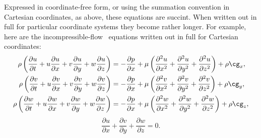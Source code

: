 \documentclass[twoside,11pt]		{report}
\begin{document}
Expressed in coordinate-free form, or using the summation convention
in Cartesian coordinates, as above, these equations are succint. When
written out in full for particular coordinate systems they become
rather longer. For example, here are the incompressible-flow \NavSto\
equations written out in full for Cartesian coordinates:
\begin{align*}
\rho\left(
 \frac{\partial u}{\partial t} +
u\frac{\partial u}{\partial x} +
v\frac{\partial u}{\partial y} +
w\frac{\partial u}{\partial z}\right) &=
-\frac{\partial p}{\partial x}+
\mu\left(
\frac{\partial^2 u}{\partial x^2} +
\frac{\partial^2 u}{\partial y^2} +
\frac{\partial^2 u}{\partial z^2}
\right) + \rho\cg_x,\\
\rho\left(
 \frac{\partial v}{\partial t} +
u\frac{\partial v}{\partial x} +
v\frac{\partial v}{\partial y} +
w\frac{\partial v}{\partial z}\right) &=
-\frac{\partial p}{\partial x}+
\mu\left(
\frac{\partial^2 v}{\partial x^2} +
\frac{\partial^2 v}{\partial y^2} +
\frac{\partial^2 v}{\partial z^2}
\right) + \rho\cg_y,\\
\rho\left(
 \frac{\partial w}{\partial t} +
u\frac{\partial w}{\partial x} +
v\frac{\partial w}{\partial y} +
w\frac{\partial w}{\partial z}\right) &=
-\frac{\partial p}{\partial x}+
\mu\left(
\frac{\partial^2 w}{\partial x^2} +
\frac{\partial^2 w}{\partial y^2} +
\frac{\partial^2 w}{\partial z^2}
\right) + \rho\cg_z,
\end{align*}
\[
\frac{\partial u}{\partial x} +
\frac{\partial v}{\partial y} +
\frac{\partial w}{\partial z} = 0.
\]
\end{document}
